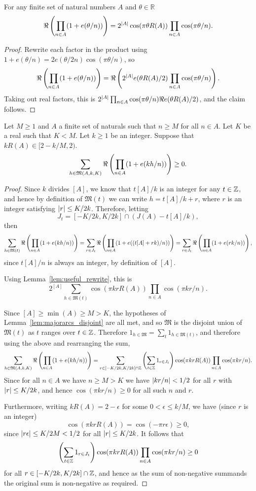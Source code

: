 \begin{lemma}\label{lem:useful_rewrite}
For any finite set of natural numbers $A$ and $\theta\in \mathbb{R}$
\[\Re\left( \prod_{n\in A}(1+e(\theta/n))\right)=2^{\left\lvert A\right\rvert}\cos(\pi \theta R(A))\prod_{n\in A}\cos(\pi \theta/n).\]
\end{lemma}
\begin{proof}
Rewrite each factor in the product using $1+e(\theta/n)=2e(\theta/2n)\cos(\pi \theta/n)$, so
\[\Re\left( \prod_{n\in A}(1+e(\theta/n))\right) = \Re\left(  2^{\left\lvert A\right\rvert}e(\theta R(A)/2)\prod_{n\in A}\cos(\pi \theta/n)\right).\]
Taking out real factors, this is $2^{\left\lvert A\right\rvert}\prod_{n\in A}\cos(\pi \theta/n)\Re e(\theta R(A)/2)$, and the claim follows.
\end{proof}

\begin{lemma}\label{lem:majorarcs}
Let $M\geq 1$ and $A$ a finite set of naturals such that $n\geq M$ for all $n\in A$. Let $K$ be a real such that $K<M$. Let $k\geq 1$ be an integer. Suppose that $kR(A) \in [2-k/M,2)$.
\[\sum_{h\in \mathfrak{M}(A,k,K)}\Re\left( \prod_{n\in A}(1+e(kh/n))\right) \geq 0.\]
\end{lemma}
\begin{proof}
Since $k$ divides $[A]$, we know that $t[A]/k$ is an integer for any $t\in \mathbb{Z}$, and hence by definition of $\mathfrak{M}(t)$ we can write $h=t[A]/k+r$, where $r$ is an integer satisfying $\left\lvert r\right\rvert\leq K/2k$. Therefore, letting
\[J_t =[-K/2k,K/2k]\cap (J(A)-t[A]/k),\]
then
\[\sum_{h\in \mathfrak{M}(t)}\Re\left( \prod_{n\in A}(1+e(kh/n))\right)=\sum_{r\in J_t}\Re\left( \prod_{n\in A}(1+e((t[A]+rk)/n))\right)=\sum_{r\in J_t}\Re\left( \prod_{n\in A}(1+e(rk/n))\right),\]
since $t[A]/n$ is always an integer, by definition of $[A]$.

Using Lemma~\ref{lem:useful_rewrite}, this is
\[2^{[A]}\sum_{h\in \mathfrak{M}(t)}\cos(\pi krR(A))\prod_{n\in A}\cos(\pi kr/n).\]


Since $[A]\geq \min(A)\geq M>K$, the hypotheses of Lemma~\ref{lem:majorarcs_disjoint} are all met, and so $\mathfrak{M}$ is the disjoint union of $\mathfrak{M}(t)$ as $t$ ranges over $t\in \mathbb{Z}$. Therefore $1_{h\in\mathfrak{M}}=\sum_t 1_{h\in \mathfrak{M}(t)}$, and therefore using the above and rearranging the sum,
\[\sum_{h\in \mathfrak{M}(A,k,K)}\Re\left( \prod_{n\in A}(1+e(kh/n))\right)
=\sum_{r\in [-K/2k,K/2k]\cap\mathbb{Z}}\left( \sum_{t\in \mathbb{Z}}1_{r\in J_t}\right)\cos(\pi krR(A))\prod_{n\in A}\cos(\pi kr/n).\]
Since for all $n\in A$ we have $n\geq M>K$ we have $\left\lvert kr/n\right\rvert< 1/2$ for all $r$ with $\left\lvert r\right\rvert\leq K/2k$, and hence $\cos(\pi kr/n)\geq 0$ for all such $n$ and $r$.

Furthermore, writing $kR(A)=2-\epsilon$ for some $0<\epsilon\leq k/M$, we have (since $r$ is an integer)
\[\cos(\pi kr R(A)) = \cos(-\pi r\epsilon)\geq 0,\]
since $\left\lvert r\epsilon\right\rvert\leq K/2M<1/2$ for all $\left\lvert r\right\rvert\leq K/2k$. It follows that
\[\left( \sum_{t\in \mathbb{Z}}1_{r\in J_t}\right)\cos(\pi krR(A))\prod_{n\in A}\cos(\pi kr/n)\geq 0\]
for all $r\in [-K/2k,K/2k]\cap \mathbb{Z}$, and hence as the sum of non-negative summands the original sum is non-negative as required.
\end{proof}


